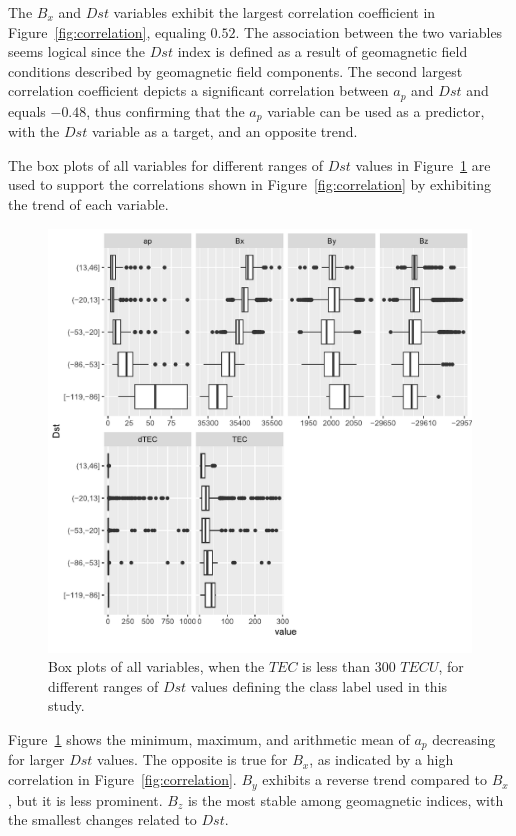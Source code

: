 \let\LaTeXcline\cline\documentclass[sn-mathphys-num]{sn-jnl}\let\cline\LaTeXcline
\begin{document}
The $B_{x}$ and $Dst$ variables exhibit the largest correlation coefficient in Figure~\ref{fig:correlation}, equaling $0.52$. The association between the two variables seems logical since the $Dst$ index is defined as a result of geomagnetic field conditions described by geomagnetic field components. The second largest correlation coefficient depicts a significant correlation between $a_{p}$ and $Dst$ and equals $-0.48$, thus confirming that the $a_{p}$ variable can be used as a predictor, with the $Dst$ variable as a target, and an opposite trend.

The box plots of all variables for different ranges of $Dst$ values in Figure~\ref{fig:iono3boxplot} are used to support the correlations shown in Figure~\ref{fig:correlation} by exhibiting the trend of each variable.

\begin{figure}[!ht]
    \centering
    \includegraphics[width=\linewidth]{iono3boxplot_fix.pdf}
    \caption{Box plots of all variables, when the $TEC$ is less than $300$ $TECU$, for different ranges of $Dst$ values defining the class label used in this study.}
    \label{fig:iono3boxplot}
\end{figure}

Figure~\ref{fig:iono3boxplot} shows the minimum, maximum, and arithmetic mean of $a_{p}$ decreasing for larger $Dst$ values. The opposite is true for $B_{x}$, as indicated by a high correlation in Figure~\ref{fig:correlation}. $B_{y}$ exhibits a reverse trend compared to $B_{x}$, but it is less prominent. $B_{z}$ is the most stable among geomagnetic indices, with the smallest changes related to $Dst$.
\end{document}
